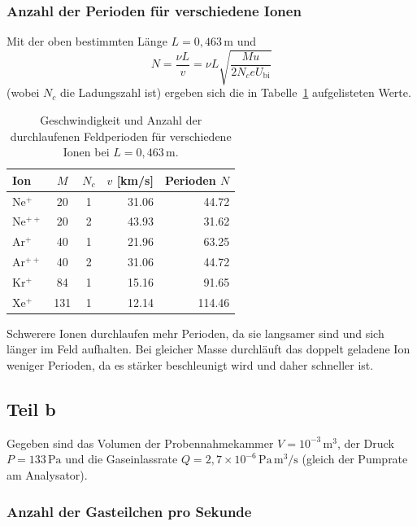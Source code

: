 \documentclass{article}
\begin{document}
\subsubsection*{Anzahl der Perioden für verschiedene Ionen}

Mit der oben bestimmten Länge $L = 0{,}463\,\mathrm{m}$ und
\begin{equation}
    N = \frac{\nu L}{v}
      = \nu L \sqrt{\frac{M u}{2 N_c e U_{\mathrm{bi}}}}
\end{equation}
(wobei $N_c$ die Ladungszahl ist) ergeben sich die in
Tabelle~\ref{tab:perioden} aufgelisteten Werte.

\begin{table}[htbp]
    \centering
    \caption{Geschwindigkeit und Anzahl der durchlaufenen Feldperioden
        für verschiedene Ionen bei $L = 0{,}463\,\mathrm{m}$.}
    \label{tab:perioden}
    \begin{tabular}{l c c r r}
        \toprule
        Ion & $M$ & $N_c$ & $v$ [km/s] & Perioden $N$ \\
        \midrule
        Ne$^+$   &  20 & 1 & 31.06 &  44.72 \\
        Ne$^{++}$ & 20 & 2 & 43.93 &  31.62 \\
        Ar$^+$   &  40 & 1 & 21.96 &  63.25 \\
        Ar$^{++}$ & 40 & 2 & 31.06 &  44.72 \\
        Kr$^+$   &  84 & 1 & 15.16 &  91.65 \\
        Xe$^+$   & 131 & 1 & 12.14 & 114.46 \\
        \bottomrule
    \end{tabular}
\end{table}

Schwerere Ionen durchlaufen mehr Perioden, da sie langsamer sind und
sich länger im Feld aufhalten. Bei gleicher Masse durchläuft das
doppelt geladene Ion weniger Perioden, da es stärker beschleunigt wird
und daher schneller ist.

\subsection{Teil b}

Gegeben sind das Volumen der Probennahmekammer $V = 10^{-3}\,\mathrm{m^3}$,
der Druck $P = 133\,\mathrm{Pa}$ und die Gaseinlassrate
$Q = 2{,}7 \times 10^{-6}\,\mathrm{Pa\,m^3/s}$ (gleich der Pumprate am
Analysator).

\subsubsection*{Anzahl der Gasteilchen pro Sekunde}
\end{document}
